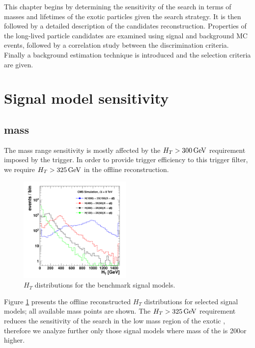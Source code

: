 This chapter begins by determining the sensitivity of the search in terms of masses and lifetimes
of the exotic particles given the search strategy. It is then followed by a detailed description
of the candidates reconstruction.
Properties of the long-lived particle 
candidates are examined using signal and background MC events, followed by a correlation study
between the discrimination criteria. Finally a background estimation technique is introduced 
and the selection criteria are given.

\section{Signal model sensitivity}
\label{sec:sigsensitivity}

\subsection{\Higgs mass}

The \Higgs mass range sensitivity is mostly affected by the $H_T>300\,\text{Ge\hspace{-.08em}V}$ requirement imposed by the trigger. 
In order to provide trigger efficiency to this trigger filter,
we require $H_T>325\,\text{Ge\hspace{-.08em}V}$ in the offline reconstruction.

\begin{figure}[htbp]
\centering
\includegraphics[width=0.49\textwidth]{plots/signal/ht.pdf}
\caption{$H_T$ distributions for the benchmark signal models.\label{fig:sight}}
\end{figure}

Figure \ref{fig:sight} presents the offline reconstructed $H_T$ distributions 
for selected signal models; all available \Higgs 
mass points are shown.
The $H_T>325\,\text{Ge\hspace{-.08em}V}$ requirement reduces the sensitivity of the search in the low mass region of the exotic \Higgs,
therefore we analyze further only those signal models where mass of the \Higgs is 200\GeV or higher.

